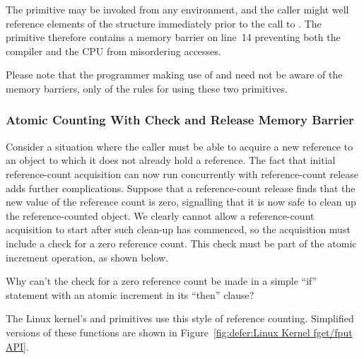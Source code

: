 The  primitive may be invoked from any environment,
and the caller might well reference elements of the 
structure immediately prior to the call to .
The  primitive therefore contains a memory
barrier on line~14 preventing both the compiler and the CPU
from misordering accesses.

Please note that the programmer making use of  and
 need not be aware of the memory barriers, only
of the rules for using these two primitives.

\subsubsection{Atomic Counting With Check and Release Memory Barrier}
\label{sec:defer:Atomic Counting With Check and Release Memory Barrier}

Consider a situation where the caller must be able to acquire a new
reference to an object to which it does not already hold a reference.
The fact that initial reference-count acquisition can now run concurrently
with reference-count release adds further complications.
Suppose that a reference-count release finds that the new
value of the reference count is zero, signalling that it is
now safe to clean up the reference-counted object.
We clearly cannot allow a reference-count acquisition to
start after such clean-up has commenced, so the acquisition
must include a check for a zero reference count.
This check must be part of the atomic increment operation,
as shown below.

\QuickQuiz{}
	Why can't the check for a zero reference count be
	made in a simple ``if'' statement with an atomic
	increment in its ``then'' clause?
 \QuickQuizEnd

The Linux kernel's  and  primitives
use this style of reference counting.
Simplified versions of these functions are shown in
Figure~\ref{fig:defer:Linux Kernel fget/fput API}.

